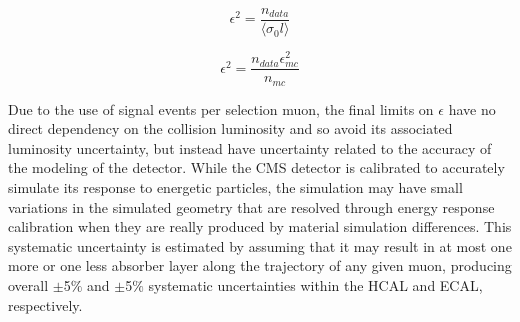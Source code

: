 \begin{equation}
	\label{eq:datarate}
	\epsilon^2 = \frac{n_{data}}{\langle \sigma_0 l\rangle}
\end{equation}

\begin{equation}
	\label{eq:fixedLumi}
	\epsilon^2 = \frac{n_{data}\epsilon_{mc}^2}{n_{mc}}  
\end{equation}

Due to the use of signal events per selection muon, the final limits on $\epsilon$ have no direct dependency on the collision luminosity and so avoid its associated luminosity uncertainty, but instead have uncertainty related to the accuracy of the modeling of the detector.
While the CMS detector is calibrated to accurately simulate its response to energetic particles, the simulation may have small variations in the simulated geometry that are resolved through energy response calibration when they are really produced by material simulation differences.
This systematic uncertainty is estimated by assuming that it may result in at most one more or one less absorber layer along the trajectory of any given muon, producing overall $\pm$5$\%$ and $\pm$5$\%$ systematic uncertainties within the HCAL and ECAL, respectively.
